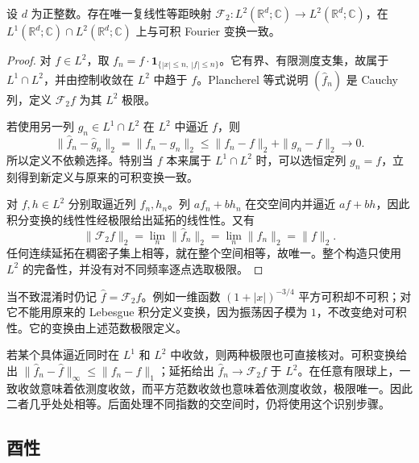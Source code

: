 \begin{theorem}\label{b2:thm:04-plancherel-extension}
设 \(d\) 为正整数。存在唯一复线性等距映射 \(\mathcal F_2:L^2(\mathbb R^d;\mathbb C)\to L^2(\mathbb R^d;\mathbb C)\)，在 \(L^1(\mathbb R^d;\mathbb C)\cap L^2(\mathbb R^d;\mathbb C)\) 上与可积 Fourier 变换一致。
\end{theorem}
\begin{proof}
对 \(f\in L^2\)，取 \(f_n=f\cdot\mathbf1_{\{|x|\leq n,\ |f|\leq n\}}\)。它有界、有限测度支集，故属于 \(L^1\cap L^2\)，并由控制收敛在 \(L^2\) 中趋于 \(f\)。Plancherel 等式说明 \((\widehat f_n)\) 是 Cauchy 列，定义 \(\mathcal F_2f\) 为其 \(L^2\) 极限。

若使用另一列 \(g_n\in L^1\cap L^2\) 在 \(L^2\) 中逼近 \(f\)，则
\[
 \|\widehat f_n-\widehat g_n\|_2
 =\|f_n-g_n\|_2
 \leq\|f_n-f\|_2+\|g_n-f\|_2\longrightarrow0.
\]
所以定义不依赖选择。特别当 \(f\) 本来属于 \(L^1\cap L^2\) 时，可以选恒定列 \(g_n=f\)，立刻得到新定义与原来的可积变换一致。

对 \(f,h\in L^2\) 分别取逼近列 \(f_n,h_n\)。列 \(af_n+bh_n\) 在交空间内并逼近 \(af+bh\)，因此积分变换的线性性经极限给出延拓的线性性。又有
\[
 \|\mathcal F_2f\|_2
 =\lim_n\|\widehat f_n\|_2
 =\lim_n\|f_n\|_2=\|f\|_2.
\]
任何连续延拓在稠密子集上相等，就在整个空间相等，故唯一。整个构造只使用 \(L^2\) 的完备性，并没有对不同频率逐点选取极限。
\end{proof}

当不致混淆时仍记 \(\widehat f=\mathcal F_2f\)。例如一维函数 \((1+|x|)^{-3/4}\) 平方可积却不可积；对它不能用原来的 Lebesgue 积分定义变换，因为振荡因子模为 \(1\)，不改变绝对可积性。它的变换由上述范数极限定义。

\ProseParagraphBreak

若某个具体逼近同时在 \(L^1\) 和 \(L^2\) 中收敛，则两种极限也可直接核对。可积变换给出 \(\|\widehat f_n-\widehat f\|_\infty\leq\|f_n-f\|_1\)；延拓给出 \(\widehat f_n\to\mathcal F_2f\) 于 \(L^2\)。在任意有限球上，一致收敛意味着依测度收敛，而平方范数收敛也意味着依测度收敛，极限唯一。因此二者几乎处处相等。后面处理不同指数的交空间时，仍将使用这个识别步骤。

\subsection{酉性}
\label{b2:subsec:040103}

